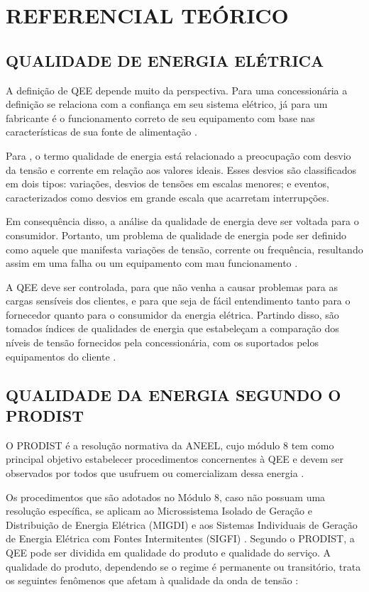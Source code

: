 \chapter{REFERENCIAL TEÓRICO}

\section{QUALIDADE DE ENERGIA ELÉTRICA}

A definição de QEE depende muito da perspectiva. Para uma concessionária a definição se relaciona com a confiança em seu sistema elétrico, já para um fabricante é o funcionamento correto de seu equipamento com base nas características de sua fonte de alimentação \cite{ref:dugan_2004}.

Para , o termo qualidade de energia está relacionado a preocupação com desvio da tensão e corrente em relação aos valores ideais. Esses desvios são classificados em dois tipos: variações, desvios de tensões em escalas menores; e eventos, caracterizados como desvios em grande escala que acarretam interrupções.

Em consequência disso, a análise da qualidade de energia deve ser voltada para o consumidor. Portanto, um problema de qualidade de energia pode ser definido como aquele que manifesta variações de tensão, corrente ou frequência, resultando assim em uma falha ou um equipamento com mau funcionamento \cite{ref:dugan_2004}.

A QEE deve ser controlada, para que não venha a causar problemas para as cargas sensíveis dos clientes, e para que seja de fácil entendimento tanto para o fornecedor quanto para o consumidor da energia elétrica. Partindo disso, são tomados índices de qualidades de energia que estabeleçam a comparação dos níveis de tensão fornecidos pela concessionária, com os suportados pelos equipamentos do cliente \cite{ref:dugan_2004}.

\section{QUALIDADE DA ENERGIA SEGUNDO O PRODIST}

O PRODIST é a resolução normativa da ANEEL, cujo módulo 8 tem como principal objetivo estabelecer procedimentos concernentes à QEE e devem ser observados por todos que usufruem ou comercializam dessa energia \cite{ref:ANEEL2021}.

Os procedimentos que são adotados no Módulo 8, caso não possuam uma resolução específica, se aplicam ao Microssistema Isolado de Geração e Distribuição de Energia Elétrica (MIGDI) e aos Sistemas Individuais de Geração de Energia Elétrica com Fontes Intermitentes (SIGFI) \cite{ref:ANEEL2021}. Segundo o PRODIST, a QEE pode ser dividida em qualidade do produto e qualidade do serviço. A qualidade do produto, dependendo se o regime é permanente ou transitório, trata os seguintes fenômenos que afetam à qualidade da onda de tensão \cite{ref:ANEEL2021}:

